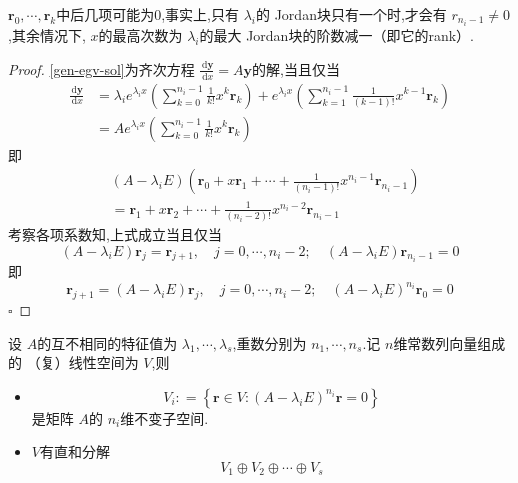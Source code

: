 \documentclass[lang=cn,12pt,color=green,fontset=none]{elegantbook}
\begin{document}
 \begin{remark}
     $ \mathbf{r}_{0},\cdots , \mathbf{r}_{k} $中后几项可能为0,事实上,只有 $  \lambda _{i} $的 Jordan块只有一个时,才会有 $ r_{n_{i}-1} \neq  0 $,其余情况下, $ x $的最高次数为 $  \lambda _{i} $的最大 Jordan块的阶数减一（即它的rank）.     
 \end{remark}
\begin{proof}
    \ref{gen-egv-sol}为齐次方程 $ \frac{\,\mathrm{d}  \mathbf{y} }{\,\mathrm{d} x } = A \mathbf{y}  $的解,当且仅当 $$
    \begin{aligned}
    \frac{ \,\mathrm{d}  \mathbf{y} }{\,\mathrm{d} x } & =    \lambda _{i}e^{ \lambda _{i}x}\left(  \sum _{k=0}^{n_{i}-1} \frac{1 }{k! } x^{k}\mathbf{r}_{k}  \right) + e^{ \lambda _{i}x} \left( \sum _{k=1}^{n_{i}-1} \frac{1}{\left( k-1 \right)! }x^{k-1}\mathbf{r}_{k} \right) \\ 
     & = A e^{ \lambda _{i}x}\left( \sum _{k=0}^{n_{i}-1} \frac{1}{k!}x^{k}\mathbf{r}_{k} \right) 
    \end{aligned}
    $$ 即 $$
  \begin{aligned}
    & \left( A- \lambda _{i}E \right)\left( \mathbf{r}_{0}+  x \mathbf{r}_{1}+ \cdots + \frac{1}{\left( n_{i}-1 \right)! }x^{n_{i}-1} \mathbf{r}_{n_{i}-1} \right)  \\ 
     & =  \mathbf{r}_{1}+ x \mathbf{r}_{2}+ \cdots +  \frac{1}{\left( n_{i}-2 \right)! } x^{n_{i}-2} \mathbf{r}_{n_{i}-1}
  \end{aligned}
    $$考察各项系数知,上式成立当且仅当 $$
    \left( A- \lambda _{i}E \right) \mathbf{r}_{j} = \mathbf{r}_{ j + 1},\quad  j= 0,\cdots , n_{i}-2;\quad  \left( A-  \lambda _{i}E \right)\mathbf{r}_{n_{i}-1} =0  
    $$即 $$
    \mathbf{r}_{j + 1} = \left( A- \lambda _{i}E \right) \mathbf{r}_{j},\quad j =0,\cdots ,n_{i}-2;\quad  \left( A- \lambda _{i}E \right)^{n_{i}} \mathbf{r}_{0}=0  
    $$
    \hfill $\square$
\end{proof}
\begin{lemma}
    设 $ A $的互不相同的特征值为 $  \lambda _{1},\cdots , \lambda _{s} $,重数分别为 $  n_1,\cdots,n_s  $.记 $ n $维常数列向量组成的
    （复）线性空间为 $ V $,则
    \begin{itemize}
        \item  $$
        V_{i}: = \left\{ \mathbf{r}\in V : \left( A- \lambda _{i}E \right)^{n_{i}} \mathbf{r} =0 \right\}
        $$是矩阵 $ A $的 $ n_{i} $维不变子空间.
        \item $ V $有直和分解 $$
        V_1\oplus V_2 \oplus \cdots \oplus V_{s}
        $$   
    \end{itemize}
         
    
\end{lemma}
\end{document}
